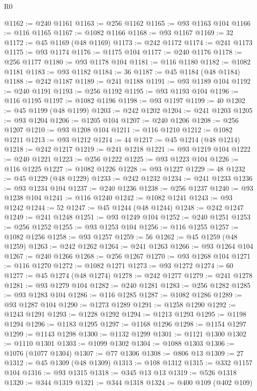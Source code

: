\begin{lexlean}{R0}
\begin{coremodule}
@1162 := @240 @1161
@1163 := @256 @1162
@1165 := @93 @1163 @104
@1166 := @116 @1165
@1167 := @1082 @1166
@1168 := @93 @1167
@1169 := 32
@1172 := @45 @1169 (@48 @1169)
@1173 := @242 @1172
@1174 := @241 @1173
@1175 := @93 @1174
@1176 := @1175 @104
@1177 := @240 @1176
@1178 := @256 @1177
@1180 := @93 @1178 @104
@1181 := @116 @1180
@1182 := @1082 @1181
@1183 := @93 @1182
@1184 := 36
@1187 := @45 @1184 (@48 @1184)
@1188 := @242 @1187
@1189 := @241 @1188
@1191 := @93 @1189 @104
@1192 := @240 @1191
@1193 := @256 @1192
@1195 := @93 @1193 @104
@1196 := @116 @1195
@1197 := @1082 @1196
@1198 := @93 @1197
@1199 := 40
@1202 := @45 @1199 (@48 @1199)
@1203 := @242 @1202
@1204 := @241 @1203
@1205 := @93 @1204
@1206 := @1205 @104
@1207 := @240 @1206
@1208 := @256 @1207
@1210 := @93 @1208 @104
@1211 := @116 @1210
@1212 := @1082 @1211
@1213 := @93 @1212
@1214 := 44
@1217 := @45 @1214 (@48 @1214)
@1218 := @242 @1217
@1219 := @241 @1218
@1221 := @93 @1219 @104
@1222 := @240 @1221
@1223 := @256 @1222
@1225 := @93 @1223 @104
@1226 := @116 @1225
@1227 := @1082 @1226
@1228 := @93 @1227
@1229 := 48
@1232 := @45 @1229 (@48 @1229)
@1233 := @242 @1232
@1234 := @241 @1233
@1236 := @93 @1234 @104
@1237 := @240 @1236
@1238 := @256 @1237
@1240 := @93 @1238 @104
@1241 := @116 @1240
@1242 := @1082 @1241
@1243 := @93 @1242
@1244 := 52
@1247 := @45 @1244 (@48 @1244)
@1248 := @242 @1247
@1249 := @241 @1248
@1251 := @93 @1249 @104
@1252 := @240 @1251
@1253 := @256 @1252
@1255 := @93 @1253 @104
@1256 := @116 @1255
@1257 := @1082 @1256
@1258 := @93 @1257
@1259 := 56
@1262 := @45 @1259 (@48 @1259)
@1263 := @242 @1262
@1264 := @241 @1263
@1266 := @93 @1264 @104
@1267 := @240 @1266
@1268 := @256 @1267
@1270 := @93 @1268 @104
@1271 := @116 @1270
@1272 := @1082 @1271
@1273 := @93 @1272
@1274 := 60
@1277 := @45 @1274 (@48 @1274)
@1278 := @242 @1277
@1279 := @241 @1278
@1281 := @93 @1279 @104
@1282 := @240 @1281
@1283 := @256 @1282
@1285 := @93 @1283 @104
@1286 := @116 @1285
@1287 := @1082 @1286
@1289 := @93 @1287 @104
@1290 := @1273 @1289
@1291 := @1258 @1290
@1292 := @1243 @1291
@1293 := @1228 @1292
@1294 := @1213 @1293
@1295 := @1198 @1294
@1296 := @1183 @1295
@1297 := @1168 @1296
@1298 := @1154 @1297
@1299 := @1143 @1298
@1300 := @1132 @1299
@1301 := @1121 @1300
@1302 := @1110 @1301
@1303 := @1099 @1302
@1304 := @1088 @1303
@1306 := @1076 (@1077 @1304)
@1307 := @77 @1306
@1308 := @806 @13
@1309 := 27
@1312 := @45 @1309 (@48 @1309)
@1313 := @108 @1312
@1315 := @332 @1157 @104
@1316 := @93 @1315
@1318 := @345 @13 @13
@1319 := @526 @1318
@1320 := @344 @1319
@1321 := @344 @1318
@1324 := @400 @109 (@402 @109)

\end{coremodule}
\end{lexlean}
